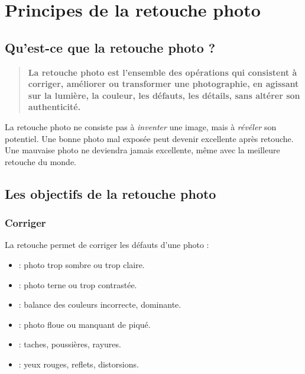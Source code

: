 \section{Principes de la retouche photo}

\subsection{Qu'est-ce que la retouche photo ?}

\begin{quote}
\textbf{La retouche photo est l'ensemble des opérations qui consistent à corriger, améliorer ou transformer une photographie, en agissant sur la lumière, la couleur, les défauts, les détails, sans altérer son authenticité.}
\end{quote}

La retouche photo ne consiste pas à \emph{inventer} une image, mais à \emph{révéler} son potentiel. Une bonne photo mal exposée peut devenir excellente après retouche. Une mauvaise photo ne deviendra jamais excellente, même avec la meilleure retouche du monde.

\subsection{Les objectifs de la retouche photo}

\subsubsection{Corriger}

La retouche permet de corriger les défauts d'une photo :

\begin{itemize}
    \item {} : photo trop sombre ou trop claire.
    \item {} : photo terne ou trop contrastée.
    \item {} : balance des couleurs incorrecte, dominante.
    \item {} : photo floue ou manquant de piqué.
    \item {} : taches, poussières, rayures.
    \item {} : yeux rouges, reflets, distorsions.
\end{itemize}

